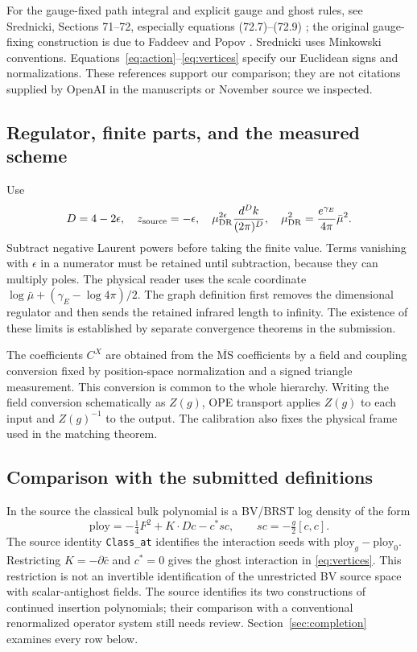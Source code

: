 \documentclass[11pt]{article}
\newcommand{\MS}{\overline{\mathrm{MS}}}
\newcommand{\code}[1]{{\small\nolinkurl{#1}}}
\begin{document}
For the gauge-fixed path integral and explicit gauge and ghost rules, see
Srednicki, Sections 71--72, especially equations (72.7)--(72.9)
\cite{srednicki}; the original gauge-fixing construction is due to
Faddeev and Popov \cite{fp}. Srednicki uses Minkowski conventions.
Equations~\eqref{eq:action}--\eqref{eq:vertices} specify our Euclidean
signs and normalizations. These references support our comparison; they
are not citations supplied by OpenAI in the manuscripts or November source
we inspected.

\subsection{Regulator, finite parts, and the measured scheme}

Use
\begin{equation}\label{eq:scheme}
 D=4-2\epsilon,\quad z_{\rm source}=-\epsilon,\quad
 \mu_{\rm DR}^{2\epsilon}\frac{d^Dk}{(2\pi)^D},\quad
 \mu_{\rm DR}^2=\frac{e^{\gamma_E}}{4\pi}\bar\mu^2.
\end{equation}
Subtract negative Laurent powers before taking the finite value. Terms
vanishing with $\epsilon$ in a numerator must be retained until subtraction,
because they can multiply poles. The physical reader uses the scale
coordinate $\log\bar\mu+(\gamma_E-\log4\pi)/2$. The graph definition first
removes the dimensional regulator and then sends the retained infrared
length to infinity. The existence of these limits is established by separate
convergence theorems in the submission.

The coefficients $C^X$ are obtained from the $\MS$ coefficients by a field
and coupling conversion fixed by position-space normalization and a signed
triangle measurement. This conversion is common to the whole hierarchy.
Writing the field conversion schematically as $Z(g)$, OPE transport applies
$Z(g)$ to each input and $Z(g)^{-1}$ to the output. The calibration also fixes
the physical frame used in the matching theorem.

\subsection{Comparison with the submitted definitions}
\label{sec:dictionary}

In the source the classical bulk polynomial is a BV/BRST log density of the
form
\[
 \mathrm{ploy}=-\tfrac14F^2+K\cdot Dc-c^*sc,
 \qquad sc=-\tfrac g2[c,c].
\]
The source identity \code{Class_at} identifies the interaction seeds with
$\mathrm{ploy}_g-\mathrm{ploy}_0$. Restricting $K=-\partial\bar c$ and
$c^*=0$ gives the ghost interaction in \eqref{eq:vertices}. This restriction
is not an invertible identification of the unrestricted BV source space
with scalar-antighost fields. The source identifies its two constructions of continued insertion
polynomials; their comparison with a conventional renormalized operator
system still needs review. Section~\ref{sec:completion} examines every row below.
\end{document}
